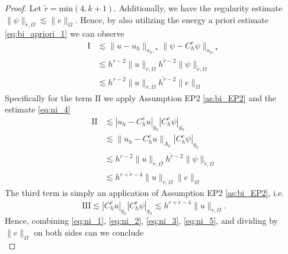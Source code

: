 \documentclass[11pt]{article}
\theoremstyle{remark}
\newcommand{\abs}[1]{\left\lvert #1 \right\rvert}
\numberwithin{equation}{section}
\begin{document}
\begin{proof}
        Let $\widetilde{r} = \mathrm{min} ( 4, k+1)  $. Additionally, we have the regularity estimate $\| \psi \|_{\widetilde{r},\Omega   }^{  } \lesssim \| e \|_{ \Omega   }^{  } $.
        Hence, by also  utilizing the energy a priori estimate \eqref{eq:bi_apriori_1} we can observe
        \begin{equation}
            \label{eq:ni_2}
            \begin{split}
             \mathrm{I}    & \lesssim     \|u-u_{h}  \|_{a_{h},*  }^{  }    \| \psi  - C^{e}_{h}\psi \|_{a_{h},*  }^{  } \\
                & \lesssim     h^{r-2} \| u \|_{ r,\Omega   }^{  } h^{\widetilde{r}-2}   \| \psi   \|_{\widetilde{r},\Omega  }^{  } \\
                & \lesssim     h^{r-2} \| u \|_{ r,\Omega   }^{  }  h^{\widetilde{r}-2}  \| e   \|_{\Omega }^{  }
            \end{split}
        \end{equation}
        Specifically for the term $\mathrm{II} $ we apply Assumption EP2 \eqref{as:bi_EP2} and the estimate \eqref{eq:ni_4}
        \begin{equation}
            \label{eq:ni_3}
            \begin{split}
                \mathrm{II}  & \lesssim \abs{ u_{h} - C_{h}^{e}u } _{g_{h}} \abs{ C^{e}_{h} \psi }_{g_{h}}  \\
                & \lesssim  \| u_{h} - C_{h}^{e}u  \|_{A_{h}} \abs{ C^{e}_{h} \psi }_{g_{h}} \\
                             & \lesssim h^{r-2}  \| u  \|_{r,\Omega } h^{\widetilde{r}-2} \| \psi  \|_{\widetilde{r}, \Omega   }^{  } \\
                             & \lesssim h^{r + \widetilde{r} -4}   \| u  \|_{r,\Omega } \| e \|_{ \Omega   }^{  }
            \end{split}
        \end{equation}
        The third term is simply an application of Assumption EP2 \eqref{as:bi_EP2}, i.e.
        \begin{equation}
            \label{eq:ni_5}
             \mathrm{III}  \lesssim  \abs{ C^{e}_{h}u }_{g_{h}}  \abs{ C^{e}_{h}\psi }_{g_{h}} \lesssim h^{r + \widetilde{r}-4} \| u \|_{ r,\Omega  }^{  }.
        \end{equation}
        Hence, combining \eqref{eq:ni_1}, \eqref{eq:ni_2}, \eqref{eq:ni_3}, \eqref{eq:ni_5}, and dividing by $\| e \|_{ \Omega  }^{  } $ on both sides can we conclude
        \begin{equation}

\end{equation}
\end{proof}
\end{document}
